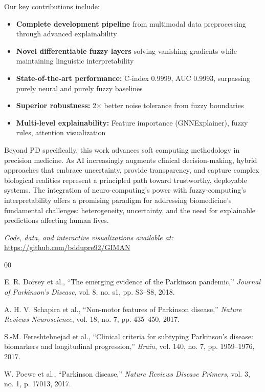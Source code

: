 \documentclass[conference]{IEEEtran}
\begin{document}
{{{Our key contributions include:

\begin{itemize}
    \item \textbf{Complete development pipeline} from multimodal data preprocessing through advanced explainability
    \item \textbf{Novel differentiable fuzzy layers} solving vanishing gradients while maintaining linguistic interpretability
    \item \textbf{State-of-the-art performance:} C-index 0.9999, AUC 0.9993, surpassing purely neural and purely fuzzy baselines
    \item \textbf{Superior robustness:} 2× better noise tolerance from fuzzy boundaries
    \item \textbf{Multi-level explainability:} Feature importance (GNNExplainer), fuzzy rules, attention visualization
\end{itemize}

Beyond PD specifically, this work advances soft computing methodology in precision medicine. As AI increasingly augments clinical decision-making, hybrid approaches that embrace uncertainty, provide transparency, and capture complex biological realities represent a principled path toward trustworthy, deployable systems. The integration of neuro-computing's power with fuzzy-computing's interpretability offers a promising paradigm for addressing biomedicine's fundamental challenges: heterogeneity, uncertainty, and the need for explainable predictions affecting human lives.

\textit{Code, data, and interactive visualizations available at:} \url{https://github.com/bddupre92/GIMAN}

\begin{thebibliography}{00}

E. R. Dorsey et al., ``The emerging evidence of the Parkinson pandemic,'' \textit{Journal of Parkinson's Disease}, vol. 8, no. s1, pp. S3--S8, 2018.

A. H. V. Schapira et al., ``Non-motor features of Parkinson disease,'' \textit{Nature Reviews Neuroscience}, vol. 18, no. 7, pp. 435--450, 2017.

S.-M. Fereshtehnejad et al., ``Clinical criteria for subtyping Parkinson's disease: biomarkers and longitudinal progression,'' \textit{Brain}, vol. 140, no. 7, pp. 1959--1976, 2017.

W. Poewe et al., ``Parkinson disease,'' \textit{Nature Reviews Disease Primers}, vol. 3, no. 1, p. 17013, 2017.


\end{thebibliography}}}}
\end{document}
